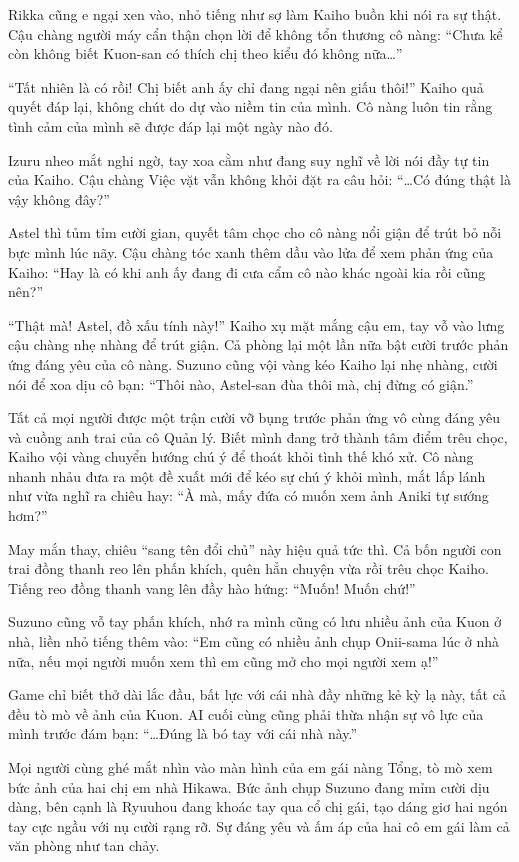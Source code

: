 \documentclass[../main.tex]{subfiles}
\begin{document}
Rikka cũng e ngại xen vào, nhỏ tiếng như sợ làm Kaiho buồn khi nói ra sự thật. Cậu chàng người máy cẩn thận chọn lời để không tổn thương cô nàng: ``Chưa kể còn không biết Kuon-san có thích chị theo kiểu đó không nữa\dots''

``Tất nhiên là có rồi! Chị biết anh ấy chỉ đang ngại nên giấu thôi!'' Kaiho quả quyết đáp lại, không chút do dự vào niềm tin của mình. Cô nàng luôn tin rằng tình cảm của mình sẽ được đáp lại một ngày nào đó.

Izuru nheo mắt nghi ngờ, tay xoa cằm như đang suy nghĩ về lời nói đầy tự tin của Kaiho. Cậu chàng Việc vặt vẫn không khỏi đặt ra câu hỏi: ``\dots Có đúng thật là vậy không đây?''

Astel thì tủm tỉm cười gian, quyết tâm chọc cho cô nàng nổi giận để trút bỏ nỗi bực mình lúc nãy. Cậu chàng tóc xanh thêm dầu vào lửa để xem phản ứng của Kaiho: ``Hay là có khi anh ấy đang đi cưa cẩm cô nào khác ngoài kia rồi cũng nên?''

``Thật mà! Astel, đồ xấu tính này!'' Kaiho xụ mặt mắng cậu em, tay vỗ vào lưng cậu chàng nhẹ nhàng để trút giận. Cả phòng lại một lần nữa bật cười trước phản ứng đáng yêu của cô nàng. Suzuno cũng vội vàng kéo Kaiho lại nhẹ nhàng, cười nói để xoa dịu cô bạn: ``Thôi nào, Astel-san đùa thôi mà, chị đừng có giận.''

Tất cả mọi người được một trận cười vỡ bụng trước phản ứng vô cùng đáng yêu và cuồng anh trai của cô Quản lý. Biết mình đang trở thành tâm điểm trêu chọc, Kaiho vội vàng chuyển hướng chú ý để thoát khỏi tình thế khó xử. Cô nàng nhanh nhảu đưa ra một đề xuất mới để kéo sự chú ý khỏi mình, mắt lấp lánh như vừa nghĩ ra chiêu hay: ``À mà, mấy đứa có muốn xem ảnh Aniki tự sướng hơm?''

May mắn thay, chiêu ``sang tên đổi chủ'' này hiệu quả tức thì. Cả bốn người con trai đồng thanh reo lên phấn khích, quên hẳn chuyện vừa rồi trêu chọc Kaiho. Tiếng reo đồng thanh vang lên đầy hào hứng: ``Muốn! Muốn chứ!''

Suzuno cũng vỗ tay phấn khích, nhớ ra mình cũng có lưu nhiều ảnh của Kuon ở nhà, liền nhỏ tiếng thêm vào: ``Em cũng có nhiều ảnh chụp Onii-sama lúc ở nhà nữa, nếu mọi người muốn xem thì em cũng mở cho mọi người xem ạ!''

Game chỉ biết thở dài lắc đầu, bất lực với cái nhà đầy những kẻ kỳ lạ này, tất cả đều tò mò về ảnh của Kuon. AI cuối cùng cũng phải thừa nhận sự vô lực của mình trước đám bạn: ``\dots Đúng là bó tay với cái nhà này.''

Mọi người cùng ghé mắt nhìn vào màn hình của em gái nàng Tổng, tò mò xem bức ảnh của hai chị em nhà Hikawa. Bức ảnh chụp Suzuno đang mỉm cười dịu dàng, bên cạnh là Ryuuhou đang khoác tay qua cổ chị gái, tạo dáng giơ hai ngón tay cực ngầu với nụ cười rạng rỡ. Sự đáng yêu và ấm áp của hai cô em gái làm cả văn phòng như tan chảy.
\end{document}
